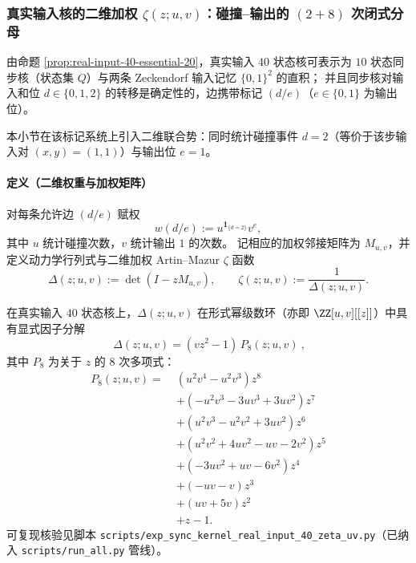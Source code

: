 \subsubsection{真实输入核的二维加权 \texorpdfstring{$\zeta(z;u,v)$}{zeta(z;u,v)}：碰撞--输出的 \texorpdfstring{$(2+8)$}{(2+8)} 次闭式分母}\label{app:real-input-40-zeta-uv}
由命题 \ref{prop:real-input-40-essential-20}，真实输入 $40$ 状态核可表示为 $10$ 状态同步核（状态集 $Q$）与两条 Zeckendorf 输入记忆 $\{0,1\}^2$ 的直积；
并且同步核对输入和位 $d\in\{0,1,2\}$ 的转移是确定性的，边携带标记 $(d/e)$（$e\in\{0,1\}$ 为输出位）。
\par
本小节在该标记系统上引入二维联合势：同时统计碰撞事件 $d=2$（等价于该步输入对 $(x,y)=(1,1)$）与输出位 $e=1$。

\paragraph{定义（二维权重与加权矩阵）}
对每条允许边 $(d/e)$ 赋权
\[
w(d/e):=u^{\mathbf{1}_{\{d=2\}}}v^{e},
\]
其中 $u$ 统计碰撞次数，$v$ 统计输出 $1$ 的次数。
记相应的加权邻接矩阵为 $M_{u,v}$，并定义动力学行列式与二维加权 Artin--Mazur $\zeta$ 函数
\[
\Delta(z;u,v):=\det(I-zM_{u,v}),
\qquad
\zeta(z;u,v):=\frac{1}{\Delta(z;u,v)}.
\]

\begin{theorem}\label{thm:real-input-40-det-uv-2plus8}
在真实输入 $40$ 状态核上，$\Delta(z;u,v)$ 在形式幂级数环（亦即 $\ZZ[u,v][[z]]$）中具有显式因子分解
\[
\boxed{\ \Delta(z;u,v)=(vz^{2}-1)\,P_{8}(z;u,v)\ },
\]
其中 $P_{8}$ 为关于 $z$ 的 $8$ 次多项式：
\[
\boxed{
\begin{aligned}
P_8(z;u,v)=\;&(u^2 v^4-u^2 v^3)z^8\\
&+(-u^2 v^3-3u v^3+3u v^2)z^7\\
&+(u^2 v^3-u^2 v^2+3u v^2)z^6\\
&+(u^2 v^2+4u v^2-u v-2v^2)z^5\\
&+(-3u v^2+u v-6v^2)z^4\\
&+(-u v-v)z^3\\
&+(u v+5v)z^2\\
&+z-1.
\end{aligned}}
\]
可复现核验见脚本 \texttt{scripts/exp\_sync\_kernel\_real\_input\_40\_zeta\_uv.py}（已纳入 \texttt{scripts/run\_all.py} 管线）。
\end{theorem}

